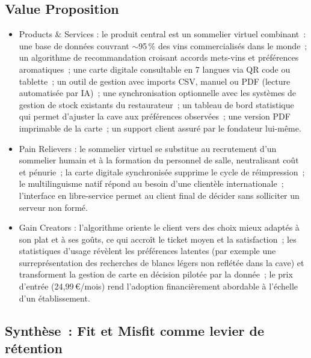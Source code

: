 \documentclass[12pt, a4paper]{article}
\begin{document}
\subsection{Value Proposition}

\begin{itemize}[leftmargin=1.5em]
  \item Products \& Services : le produit central est un sommelier virtuel
        combinant~: une base de données couvrant $\sim$95\,\% des vins
        commercialisés dans le monde~; un algorithme de recommandation croisant accords
        mets-vins et préférences aromatiques~; une carte digitale consultable en 7
        langues via QR code ou tablette~; un outil de gestion avec imports CSV,
        manuel ou PDF (lecture automatisée par IA)~; une synchronisation optionnelle
        avec les systèmes de gestion de stock existants du restaurateur~; 
        un tableau de bord statistique qui permet
        d'ajuster la cave aux préférences observées~; une version PDF imprimable de la
        carte~; un support client assuré par le fondateur lui-même.

  \item Pain Relievers :
        le sommelier virtuel se substitue au recrutement d'un sommelier humain et à la
        formation du personnel de salle, neutralisant coût et pénurie~; la carte digitale
        synchronisée supprime le cycle de réimpression~; le multilinguisme natif répond
        au besoin d'une clientèle internationale~; l'interface en libre-service permet
        au client final de décider sans solliciter un serveur non formé.

  \item Gain Creators :
        l'algorithme oriente le client vers des choix mieux adaptés à son plat et à ses
        goûts, ce qui accroît le ticket moyen et la satisfaction~; les statistiques
        d'usage révèlent les préférences latentes (par exemple une surreprésentation
        des recherches de blancs légers non reflétée dans la cave) et transforment la
        gestion de carte en décision pilotée par la donnée~; le prix d'entrée
        (24,99\,€/mois) rend l'adoption financièrement abordable à l'échelle d'un établissement.
\end{itemize}

\subsection{Synthèse~: Fit et Misfit comme levier de rétention}
\end{document}
